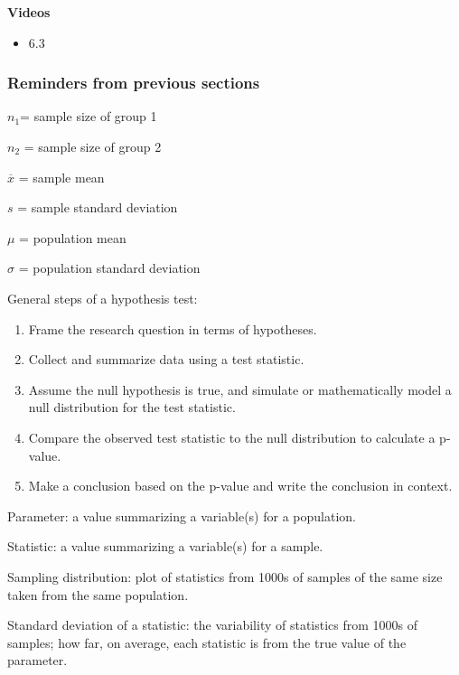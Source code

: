 \documentclass[
]{report}
\providecommand{\tightlist}{%
  \setlength{\itemsep}{0pt}\setlength{\parskip}{0pt}}
\begin{document}
\textbf{Videos}

\begin{itemize}
\tightlist
\item
  6.3
\end{itemize}


\hypertarget{reminders-from-previous-sections-6}{%
\subsubsection*{Reminders from previous sections}\label{reminders-from-previous-sections-6}}

\(n_1\)= sample size of group 1

\(n_2\) = sample size of group 2

\(\overline{x}\) = sample mean

\(s\) = sample standard deviation

\(\mu\) = population mean

\(\sigma\) = population standard deviation

General steps of a hypothesis test:

\begin{enumerate}
\def\labelenumi{\arabic{enumi}.}
\item
  Frame the research question in terms of hypotheses.
\item
  Collect and summarize data using a test statistic.
\item
  Assume the null hypothesis is true, and simulate or mathematically model a null distribution for the test statistic.
\item
  Compare the observed test statistic to the null distribution to calculate a p-value.
\item
  Make a conclusion based on the p-value and write the conclusion in context.
\end{enumerate}

Parameter: a value summarizing a variable(s) for a population.

Statistic: a value summarizing a variable(s) for a sample.

Sampling distribution: plot of statistics from 1000s of samples of the same size taken from the same population.

Standard deviation of a statistic: the variability of statistics from 1000s of samples; how far, on average, each statistic is from the true value of the parameter.
\end{document}
